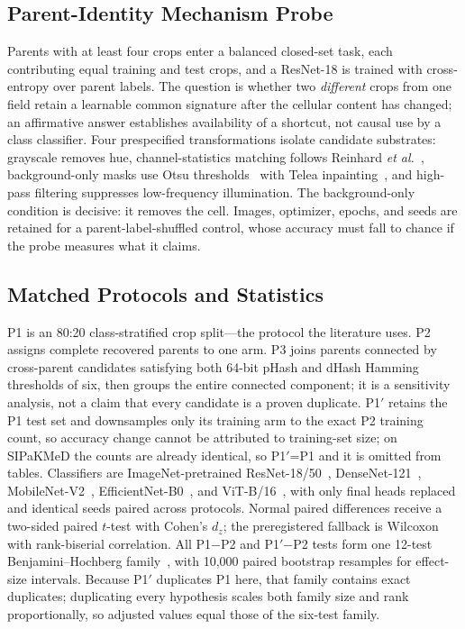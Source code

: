\documentclass[conference]{IEEEtran}
\newcommand{\protocol}[1]{\textsf{#1}}
\begin{document}
\subsection{Parent-Identity Mechanism Probe}
\label{sec:probe}
Parents with at least four crops enter a balanced closed-set task, each contributing equal training and test crops, and a ResNet-18 is trained with cross-entropy over parent labels.
The question is whether two \emph{different} crops from one field retain a learnable common signature after the cellular content has changed; an affirmative answer establishes availability of a shortcut, not causal use by a class classifier.
Four prespecified transformations isolate candidate substrates: grayscale removes hue, channel-statistics matching follows Reinhard \emph{et al.}~\cite{reinhard2001color}, background-only masks use Otsu thresholds~\cite{otsu1979threshold} with Telea inpainting~\cite{telea2004inpainting}, and high-pass filtering suppresses low-frequency illumination.
The background-only condition is decisive: it removes the cell.
Images, optimizer, epochs, and seeds are retained for a parent-label-shuffled control, whose accuracy must fall to chance if the probe measures what it claims.

\subsection{Matched Protocols and Statistics}
\protocol{P1} is an 80:20 class-stratified crop split---the protocol the literature uses.
\protocol{P2} assigns complete recovered parents to one arm.
\protocol{P3} joins parents connected by cross-parent candidates satisfying both 64-bit pHash and dHash Hamming thresholds of six, then groups the entire connected component; it is a sensitivity analysis, not a claim that every candidate is a proven duplicate.
\protocol{P1$'$} retains the \protocol{P1} test set and downsamples only its training arm to the exact \protocol{P2} training count, so accuracy change cannot be attributed to training-set size; on SIPaKMeD the counts are already identical, so \protocol{P1$'$}=\protocol{P1} and it is omitted from tables.
Classifiers are ImageNet-pretrained ResNet-18/50~\cite{he2016resnet}, DenseNet-121~\cite{huang2017densenet}, MobileNet-V2~\cite{sandler2018mobilenetv2}, EfficientNet-B0~\cite{tan2019efficientnet}, and ViT-B/16~\cite{dosovitskiy2021vit}, with only final heads replaced and identical seeds paired across protocols.
Normal paired differences receive a two-sided paired $t$-test with Cohen's $d_z$; the preregistered fallback is Wilcoxon with rank-biserial correlation.
All \protocol{P1}$-$\protocol{P2} and \protocol{P1$'$}$-$\protocol{P2} tests form one 12-test Benjamini--Hochberg family~\cite{benjamini1995fdr}, with 10,000 paired bootstrap resamples for effect-size intervals.
Because \protocol{P1$'$} duplicates \protocol{P1} here, that family contains exact duplicates; duplicating every hypothesis scales both family size and rank proportionally, so adjusted values equal those of the six-test family.
\end{document}
